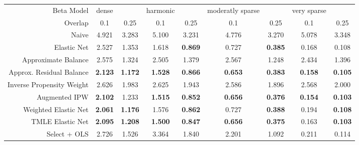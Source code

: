\begin{table}[ht]
\centering
\begin{tabular}{|r|cc|cc|cc|cc|}
   \hline
Beta Model & dense &  & harmonic &  & moderatly sparse &  & very sparse &  \\ 
  Overlap & 0.1 & 0.25 & 0.1 & 0.25 & 0.1 & 0.25 & 0.1 & 0.25 \\ 
   \hline
Naive & 4.921 & 3.283 & 5.100 & 3.231 & 4.776 & 3.270 & 5.078 & 3.348 \\ 
  Elastic Net & 2.527 & 1.353 & 1.618 &  \bf 0.869 & 0.727 &  \bf 0.385 & 0.168 & 0.108 \\ 
   \hline
Approximate Balance & 2.575 & 1.324 & 2.505 & 1.379 & 2.567 & 1.248 & 2.434 & 1.396 \\ 
  Approx. Residual Balance &  \bf 2.123 &  \bf 1.172 &  \bf 1.528 &  \bf 0.866 &  \bf 0.653 &  \bf 0.383 &  \bf 0.158 &  \bf 0.105 \\ 
   \hline
Inverse Propensity Weight & 2.626 & 1.983 & 2.625 & 1.943 & 2.586 & 1.896 & 2.568 & 2.000 \\ 
  Augmented IPW &  \bf 2.102 & 1.233 &  \bf 1.515 &  \bf 0.852 &  \bf 0.656 &  \bf 0.376 &  \bf 0.154 &  \bf 0.103 \\ 
   \hline
Weighted Elastic Net &  \bf 2.061 &  \bf 1.176 & 1.576 &  \bf 0.862 & 0.727 &  \bf 0.388 & 0.194 &  \bf 0.108 \\ 
  TMLE Elastic Net &  \bf 2.095 &  \bf 1.208 &  \bf 1.500 &  \bf 0.847 &  \bf 0.656 &  \bf 0.375 & 0.163 &  \bf 0.103 \\ 
   \hline
Select + OLS & 2.726 & 1.526 & 3.364 & 1.840 & 2.201 & 1.092 & 0.211 & 0.114 \\ 
   \hline
\end{tabular}
\end{table}
